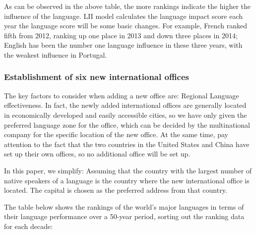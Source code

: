  As can be observed in the above table, the more rankings indicate the higher the influence of the language. LII model calculates the language impact score each year the language score will be some basic changes. For example, French ranked fifth from 2012, ranking up one place in 2013 and down three places in 2014; English has been the number one language influence in these three years, with the weakest influence in Portugal.

\subsubsection{Establishment of six new international offices} 
\noindent The key factors to consider when adding a new office are: Regional Language effectiveness. In fact, the newly added international offices are generally located in economically developed and easily accessible cities, so we have only given the preferred language zone for the office, which can be decided by the multinational company for the specific location of the new office. At the same time, pay attention to the fact that the two countries in the United States and China have set up their own offices, so no additional office will be set up.
\par In this paper, we simplify: Assuming that the country with the largest number of native speakers of a language is the country where the new international office is located. The capital is chosen as the preferred address from that country.
\par The table below shows the rankings of the world's major languages in terms of their language performance over a 50-year period, sorting out the ranking data for each decade:

